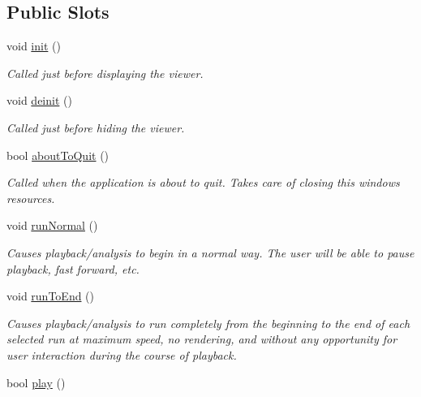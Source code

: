 \subsection*{Public Slots}
\begin{DoxyCompactItemize}
\item 
\hypertarget{class_replay_viewer_a21fb4a93700c1728e7b3b43143fa83c9}{void \hyperlink{class_replay_viewer_a21fb4a93700c1728e7b3b43143fa83c9}{init} ()}\label{class_replay_viewer_a21fb4a93700c1728e7b3b43143fa83c9}

\begin{DoxyCompactList}\small\item\em Called just before displaying the viewer. \end{DoxyCompactList}\item 
\hypertarget{class_replay_viewer_a3daf977fab46e49282cc2f9359cf9480}{void \hyperlink{class_replay_viewer_a3daf977fab46e49282cc2f9359cf9480}{deinit} ()}\label{class_replay_viewer_a3daf977fab46e49282cc2f9359cf9480}

\begin{DoxyCompactList}\small\item\em Called just before hiding the viewer. \end{DoxyCompactList}\item 
\hypertarget{class_replay_viewer_a5c11ebdfdaee0a92eaca94de5c6b8dfe}{bool \hyperlink{class_replay_viewer_a5c11ebdfdaee0a92eaca94de5c6b8dfe}{about\-To\-Quit} ()}\label{class_replay_viewer_a5c11ebdfdaee0a92eaca94de5c6b8dfe}

\begin{DoxyCompactList}\small\item\em Called when the application is about to quit. Takes care of closing this windows resources. \end{DoxyCompactList}\item 
void \hyperlink{class_replay_viewer_a8bd659a90304b9d40a2d469d1f9ac243}{run\-Normal} ()
\begin{DoxyCompactList}\small\item\em Causes playback/analysis to begin in a normal way. The user will be able to pause playback, fast forward, etc. \end{DoxyCompactList}\item 
void \hyperlink{class_replay_viewer_aa77ca895cb377625c43df1667d92179f}{run\-To\-End} ()
\begin{DoxyCompactList}\small\item\em Causes playback/analysis to run completely from the beginning to the end of each selected run at maximum speed, no rendering, and without any opportunity for user interaction during the course of playback. \end{DoxyCompactList}\item 
\hypertarget{class_replay_viewer_a06a510aa37dfc62c59e89ca30e6dcac0}{bool \hyperlink{class_replay_viewer_a06a510aa37dfc62c59e89ca30e6dcac0}{play} ()}\label{class_replay_viewer_a06a510aa37dfc62c59e89ca30e6dcac0}


\end{DoxyCompactItemize}
